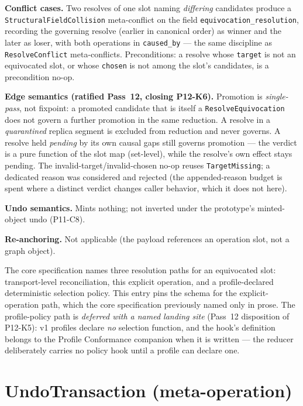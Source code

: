 \documentclass[11pt,letterpaper]{report}
\begin{document}
\textbf{Conflict cases.} Two resolves of one slot naming \emph{differing}
candidates produce a \texttt{StructuralFieldCollision} meta-conflict on the
field \texttt{equivocation\_resolution}, recording the governing resolve
(earlier in canonical order) as winner and the later as loser, with both
operations in \texttt{caused\_by} --- the same discipline as
\texttt{ResolveConflict} meta-conflicts. Preconditions: a resolve whose
\texttt{target} is not an equivocated slot, or whose \texttt{chosen} is not
among the slot's candidates, is a precondition no-op.

\textbf{Edge semantics (ratified Pass~12, closing P12-K6).} Promotion is
\emph{single-pass}, not fixpoint: a promoted candidate that is itself a
\texttt{ResolveEquivocation} does not govern a further promotion in the same
reduction. A resolve in a \emph{quarantined} replica segment is excluded from
reduction and never governs. A resolve held \emph{pending} by its own causal
gaps still governs promotion --- the verdict is a pure function of the slot
map (set-level), while the resolve's own effect stays pending. The
invalid-target/invalid-chosen no-op reuses \texttt{TargetMissing}; a dedicated
reason was considered and rejected (the appended-reason budget is spent where
a distinct verdict changes caller behavior, which it does not here).

\textbf{Undo semantics.} Mints nothing; not inverted under the prototype's
minted-object undo (P11-C8).

\textbf{Re-anchoring.} Not applicable (the payload references an operation
slot, not a graph object).

\begin{rationale}
The core specification names three resolution paths for an equivocated slot:
transport-level reconciliation, this explicit operation, and a
profile-declared deterministic selection policy. This entry pins the schema
for the explicit-operation path, which the core specification previously named
only in prose. The profile-policy path is \emph{deferred with a named landing
site} (Pass~12 disposition of P12-K5): v1 profiles declare \emph{no}
selection function, and the hook's definition belongs to the Profile
Conformance companion when it is written --- the reducer deliberately carries
no policy hook until a profile can declare one.
\end{rationale}

\section{UndoTransaction (meta-operation)}
\label{sec:k0:undo}
\end{document}
